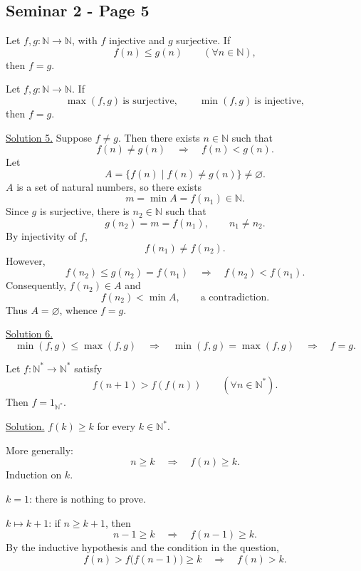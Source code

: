 
\subsection*{Seminar 2 - Page 5}

\noindent{}\quad Let $f,g:\mathbb{N}\longrightarrow\mathbb{N}$,
with $f$ injective and $g$ surjective. If
\[
 f(n)\leq g(n)\qquad (\forall n\in\mathbb{N}),
\]
\noindent then $f=g$.

\medskip
\noindent{}\quad Let $f,g:\mathbb{N}\longrightarrow\mathbb{N}$. If
\[
 \max(f,g)\ \text{is surjective},\qquad
 \min(f,g)\ \text{is injective},
\]
\noindent then $f=g$.

\medskip
\noindent\underline{Solution 5.} Suppose $f\neq g$. Then there exists
$n\in\mathbb{N}$ such that
\[
 f(n)\neq g(n)\quad\Longrightarrow\quad f(n)<g(n).
\]
\noindent Let
\[
 A=\{f(n)\mid f(n)\neq g(n)\}\neq\varnothing.
\]
\noindent $A$ is a set of natural numbers, so there exists
\[
 m=\min A=f(n_1)\in\mathbb{N}.
\]
\noindent Since $g$ is surjective, there is $n_2\in\mathbb{N}$ such that
\[
 g(n_2)=m=f(n_1),\qquad n_1\neq n_2.
\]
\noindent By injectivity of $f$,
\[
 f(n_1)\neq f(n_2).
\]
\noindent However,
\[
 f(n_2)\leq g(n_2)=f(n_1)
 \quad\Longrightarrow\quad f(n_2)<f(n_1).
\]
\noindent Consequently, $f(n_2)\in A$ and
\[
 f(n_2)<\min A,\qquad \text{a contradiction}.
\]
\noindent Thus $A=\varnothing$, whence $f=g$.

\medskip
\noindent\underline{Solution 6.}
\[
 \min(f,g)\leq\max(f,g)
 \quad\Longrightarrow\quad
 \min(f,g)=\max(f,g)
 \quad\Longrightarrow\quad f=g.
\]

\bigskip
\noindent{}\quad Let
$f:\mathbb{N}^{*}\longrightarrow\mathbb{N}^{*}$ satisfy
\[
 f(n+1)>f(f(n))\qquad (\forall n\in\mathbb{N}^{*}).
\]
\noindent Then $f=1_{\mathbb{N}^{*}}$.

\medskip
\noindent\underline{Solution.} $f(k)\geq k$ for every
$k\in\mathbb{N}^{*}$.

\noindent More generally:
\[
 n\geq k\quad\Longrightarrow\quad f(n)\geq k.
\]
\noindent Induction on $k$.

\noindent $k=1$: there is nothing to prove.

\noindent $k\longmapsto k+1$: if $n\geq k+1$, then
\[
 n-1\geq k\quad\Longrightarrow\quad f(n-1)\geq k.
\]
\noindent By the inductive hypothesis and the condition in the question,
\[
 f(n)>f\bigl(f(n-1)\bigr)\geq k
 \quad\Longrightarrow\quad f(n)>k.
\]
